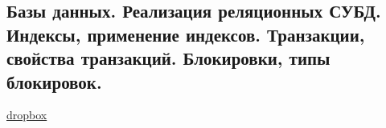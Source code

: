 \subsection{Базы данных. Реализация реляционных СУБД. Индексы, применение индексов. Транзакции, свойства транзакций. Блокировки, типы блокировок.}

\href{https://www.dropbox.com/sh/4st5b16mvdf8gkj/AADo-NrUSL5vJLWDfeAFWwy1a/Programming/13%20%D0%A0%D0%B5%D0%BB%D1%8F%D1%86%D0%B8%D0%BE%D0%BD%D0%BD%D1%8B%D0%B5%20%D0%A1%D0%A3%D0%91%D0%94.pdf?dl=0}{dropbox}